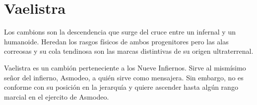 \documentclass[10pt,twoside,twocolumn,openany]{dndbook}
\begin{document}
\chapter*{Vaelistra}

Los cambions son la descendencia que surge del cruce entre un infernal y un humanoide. Heredan los 
rasgos físicos de ambos progenitores pero las alas correosas y su cola tendinosa son las marcas 
distintivas de su origen ultraterrenal.

Vaelistra es un cambión perteneciente a los Nueve Infiernos. Sirve al mismísimo señor del 
infierno, Asmodeo, a quién sirve como mensajera. Sin embargo, no es conforme con su posición en 
la jerarquía y quiere ascender hasta algún rango marcial en el ejercito de Asmodeo.

\end{document}

